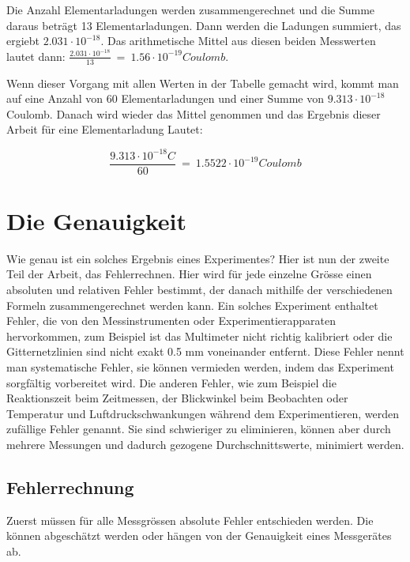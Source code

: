 \par
\noindent Die Anzahl Elementarladungen werden zusammengerechnet und die Summe daraus beträgt 13 Elementarladungen. Dann werden die Ladungen summiert, das ergiebt $2.031 \cdot 10^{-18}$. Das arithmetische Mittel aus diesen beiden Messwerten lautet dann: $\frac{2.031 \cdot 10^{-18}}{13} \ = \ 1.56 \cdot 10^{-19} Coulomb$. 

Wenn dieser Vorgang mit allen Werten in der Tabelle gemacht wird, kommt man auf eine Anzahl von 60 Elementarladungen und einer Summe von $9.313 \cdot 10^{-18}$ Coulomb. Danach wird wieder das Mittel genommen und das Ergebnis dieser Arbeit für eine Elementarladung Lautet:

\begin{equation}\label{eq:ergebnis}
	\frac{9.313 \cdot 10^{-18}C}{60} \ = \ 1.5522 \cdot 10^{-19} Coulomb
\end{equation}

\section{Die Genauigkeit}\label{sec:genauigkeitAuswertung}
Wie genau ist ein solches Ergebnis eines Experimentes? Hier ist nun der zweite Teil der Arbeit, das Fehlerrechnen. Hier wird für jede einzelne Grösse einen absoluten und relativen Fehler bestimmt, der danach mithilfe der verschiedenen Formeln zusammengerechnet werden kann. Ein solches Experiment enthaltet Fehler, die von den Messinstrumenten oder Experimentierapparaten hervorkommen, zum Beispiel ist das Multimeter nicht richtig kalibriert oder die Gitternetzlinien sind nicht exakt 0.5 mm voneinander entfernt. Diese Fehler nennt man systematische Fehler, sie können vermieden werden, indem das Experiment sorgfältig vorbereitet wird. Die anderen Fehler, wie zum Beispiel die Reaktionszeit beim Zeitmessen, der Blickwinkel beim Beobachten oder Temperatur und Luftdruckschwankungen während dem Experimentieren, werden zufällige Fehler genannt. Sie sind schwieriger zu eliminieren, können aber durch mehrere Messungen und dadurch gezogene Durchschnittswerte, minimiert werden. 

\subsection{Fehlerrechnung}\label{sub:fehler}
Zuerst müssen für alle Messgrössen absolute Fehler entschieden werden. Die können abgeschätzt werden oder hängen von der Genauigkeit eines Messgerätes ab.

